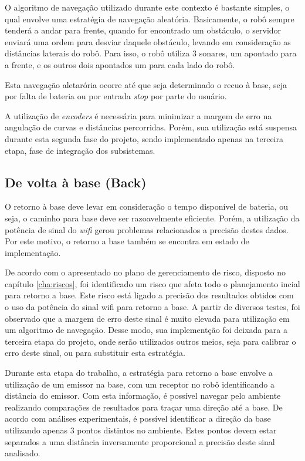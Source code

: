 	 	O algoritmo de navegação utilizado durante este contexto é bastante simples, o qual envolve uma estratégia de navegação aleatória. Basicamente, o robô sempre tenderá a andar para frente, quando for encontrado um obstáculo, o servidor enviará uma ordem para desviar daquele obstáculo, levando em consideração as distâncias laterais do robô. Para isso, o robô utiliza 3 sonares, um apontado para a frente, e os outros dois apontados um para cada lado do robô.

	 	Esta navegação aletarória ocorre até que seja determinado o recuo à base, seja por falta de bateria ou por entrada \textit{stop} por parte do usuário.

	 	A utilização de \textit{encoders} é necessária para minimizar a margem de erro na angulação de curvas e distâncias percorridas. Porém, sua utilização está suspensa durante esta segunda fase do projeto, sendo implementado apenas na terceira etapa, fase de integração dos subsistemas.

	 \subsection{De volta à base (Back)} %
	 \label{sub:de_volta_a_base_}
	 	
	 	O retorno à base deve levar em consideração o tempo disponível de bateria, ou seja, o caminho para base deve ser razoavelmente eficiente. Porém, a utilização da potência de sinal do \textit{wifi} gerou problemas relacionados a precisão destes dados. Por este motivo, o retorno a base também se encontra em estado de implementação. 

	 	De acordo com o apresentado no plano de gerenciamento de risco, disposto no capítulo \ref{cha:riscos}, foi identificado um risco que afeta todo o planejamento incial para retorno a base. Este risco está ligado a precisão dos resultados obtidos com o uso da potência do sinal wifi para retorno a base. A partir de diversos testes, foi observado que a margem de erro deste sinal é muito elevada para utilização em um algoritmo de navegação. Desse modo, sua implementção foi deixada para a terceira etapa do projeto, onde serão utilizados outros meios, seja para calibrar o erro deste sinal, ou para substituir esta estratégia.

	 	Durante esta etapa do trabalho, a estratégia para retorno a base envolve a utilização de um emissor na base, com um receptor no robô identificando a distância do emissor. Com esta informação, é possível navegar pelo ambiente realizando comparações de resultados para traçar uma direção até a base. De acordo com análises experimentais, é possível identificar a direção da base utilizando apenas 3 pontos distintos no ambiente. Estes pontos devem estar separados a uma distância inversamente proporcional a precisão deste sinal analisado.

